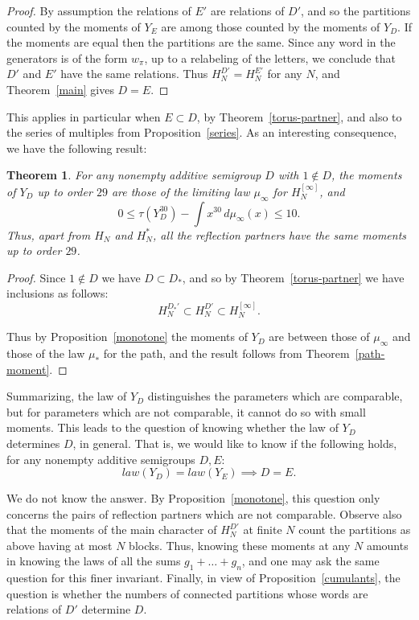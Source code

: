 \documentclass[11pt,a4paper]{article}
\newtheorem{thm}{Theorem}[section]
\begin{document}
\begin{proof}
By assumption the relations of $E'$ are relations of $D'$, and so the partitions counted by the moments of $Y_E$ are among those counted by the moments of $Y_D$. If the moments are equal then the partitions are the same. Since any word in the generators is of the form $w_\pi$, up to a relabeling of the letters, we conclude that $D'$ and $E'$ have the same relations. Thus $H_N^{D'}=H_N^{E'}$ for any $N$, and Theorem~\ref{main} gives $D=E$.
\end{proof}

This applies in particular when $E\subset D$, by Theorem~\ref{torus-partner}, and also to the series of multiples from Proposition~\ref{series}. As an interesting consequence, we have the following result:

\begin{thm}\label{universality}
For any nonempty additive semigroup $D$ with $1\notin D$, the moments of $Y_D$ up to order $29$ are those of the limiting law $\mu_\infty$ for $H_N^{[\infty]}$, and
\[
 0\leq\tau(Y_D^{30})-\int x^{30}\,d\mu_\infty(x)\leq10.
\]
Thus, apart from $H_N$ and $H_N^*$, all the reflection partners have the same moments up to order $29$.
\end{thm}

\begin{proof}
Since $1\notin D$ we have $D\subset D_*$, and so by Theorem~\ref{torus-partner} we have inclusions as follows:
\[
 H_N^{D_*'}\subset H_N^{D'}\subset H_N^{[\infty]}.
\]

Thus by Proposition~\ref{monotone} the moments of $Y_D$ are between those of $\mu_\infty$ and those of the law $\mu_*$ for the path, and the result follows from Theorem~\ref{path-moment}.
\end{proof}

Summarizing, the law of $Y_D$ distinguishes the parameters which are comparable, but for parameters which are not comparable, it cannot do so with small moments. This leads to the question of knowing whether the law of $Y_D$ determines $D$, in general. That is, we would like to know if the following holds, for any nonempty additive semigroups $D,E$:
\[
 law(Y_D)=law(Y_E)\implies D=E.
\]

We do not know the answer. By Proposition~\ref{monotone}, this question only concerns the pairs of reflection partners which are not comparable. Observe also that the moments of the main character of $H_N^{D'}$ at finite $N$ count the partitions as above having at most $N$ blocks. Thus, knowing these moments at any $N$ amounts in knowing the laws of all the sums $g_1+\ldots+g_n$, and one may ask the same question for this finer invariant. Finally, in view of Proposition~\ref{cumulants}, the question is whether the numbers of connected partitions whose words are relations of $D'$ determine $D$.
\end{document}
